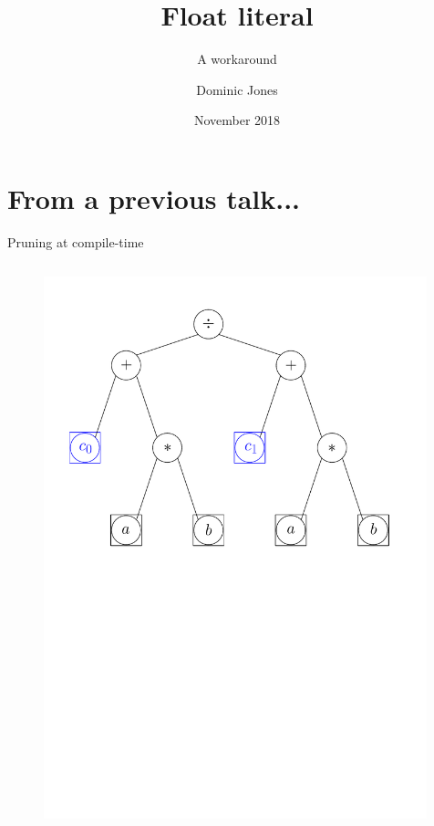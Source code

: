 \documentclass[xcolor=dvipsnames]{beamer}
\title{Float literal}
\subtitle{A workaround}
\author{Dominic Jones}
\date{\small{November 2018}}
\institute{\small{\texttt{github.com/DominicJones}}}
\begin{document}
\begin{frame}[plain]
  \titlepage
\end{frame}


\section{From a previous talk...}


\begin{frame}[fragile]{Pruning at compile-time}
  \begin{columns}[T] %
    \begin{column}{0.75\textwidth}
      \begin{figure}[H]
        \centering
        \includegraphics[width=0.99\textwidth]{fig_exprtree_cb}
      \end{figure}
    \end{column}%
  \end{columns}
\end{frame}
\end{document}
